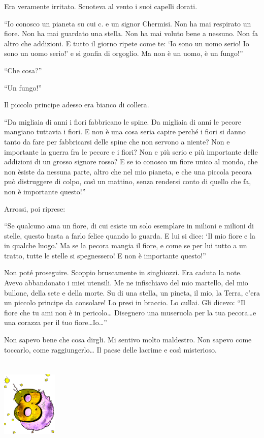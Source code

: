 \documentclass[11pt]{scrbook}
\begin{document}
Era veramente irritato. Scuoteva al vento i suoi capelli dorati.

``Io conosco un pianeta su cui c. e un signor Chermisi. Non ha mai
respirato un fiore. Non ha mai guardato una stella. Non ha mai voluto
bene a nessuno. Non fa altro che addizioni. E tutto il giorno ripete
come te: `Io sono un uomo serio! Io sono un uomo serio!' e si gonfia di
orgoglio. Ma non è un uomo, è un fungo!''

``Che cosa?''

``Un fungo!''

Il piccolo principe adesso era bianco di collera.

``Da migliaia di anni i fiori fabbricano le spine. Da migliaia di anni
le pecore mangiano tuttavia i fiori. E non è una cosa seria capire
perché i fiori si danno tanto da fare per fabbricarsi delle spine che
non servono a niente? Non e importante la guerra fra le pecore e i
fiori? Non e più serio e più importante delle addizioni di un grosso
signore rosso? E se io conosco un fiore unico al mondo, che non èsiste
da nessuna parte, altro che nel mio pianeta, e che una piccola pecora
può distruggere di colpo, così un mattino, senza rendersi conto di
quello che fa, non è importante questo!''

Arrossi, poi riprese:

``Se qualcuno ama un fiore, di cui esiste un solo esemplare in milioni e
milioni di stelle, questo basta a farlo felice quando lo guarda. E lui
si dice: `Il mio fiore e la in qualche luogo.' Ma se la pecora mangia il
fiore, e come se per lui tutto a un tratto, tutte le stelle si
spegnessero! E non è importante questo!''

Non poté proseguire. Scoppio bruscamente in singhiozzi. Era caduta la
note. Avevo abbandonato i miei utensili. Me ne infischiavo del mio
martello, del mio bullone, della sete e della morte. Su di una stella,
un pineta, il mio, la Terra, c'era un piccolo principe da consolare! Lo
presi in braccio. Lo cullai. Gli dicevo: ``Il fiore che tu ami non è in
pericolo\ldots{} Disegnero una museruola per la tua pecora\ldots{}e una
corazza per il tuo fiore\ldots{}Io\ldots{}''

Non sapevo bene che cosa dirgli. Mi sentivo molto maldestro. Non sapevo
come toccarlo, come raggiungerlo\ldots{} Il paese delle lacrime e così
misterioso.

\chapter{}
\begin{center}
\includegraphics{img/chapter8}
\end{center}
\end{document}
